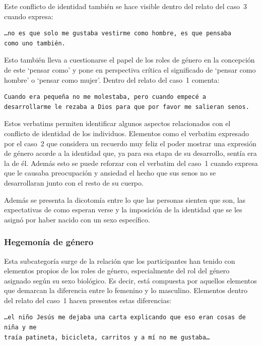 Este conflicto de identidad también se hace visible dentro del relato del caso~3
cuando expresa:

\begin{verbatim}
…no es que solo me gustaba vestirme como hombre, es que pensaba
como uno también.
\end{verbatim}

Esto también lleva a cuestionarse el papel de los roles de género en la
concepción de este ‘pensar como’ y pone en perspectiva crítica el significado de
‘pensar como hombre’ o ‘pensar como mujer’. Dentro del relato del caso~1
comenta:

\begin{verbatim}
Cuando era pequeña no me molestaba, pero cuando empecé a
desarrollarme le rezaba a Dios para que por favor me salieran senos.
\end{verbatim}

Estos verbatims permiten identificar algunos aspectos relacionados con el
conflicto de identidad de los individuos. Elementos como el verbatim expresado
por el caso~2 que considera un recuerdo muy feliz el poder mostrar una
expresión de género acorde a la identidad que, ya para esa etapa de su
desarrollo, sentía era la de él. Además esto se puede reforzar con el verbatim
del caso~1 cuando expresa que le causaba preocupación y ansiedad el hecho que
sus senos no se desarrollaran junto con el resto de su cuerpo.

Además se presenta la dicotomía entre lo que las personas sienten que son, las
expectativas de como esperan verse y la imposición de la identidad que se
les asignó por haber nacido con un sexo específico.

\subsubsection{Hegemonía de género}

Esta subcategoría surge de la relación que los participantes han tenido con
elementos propios de los roles de género, especialmente del rol del género
asignado según su sexo biológico. Es decir, está compuesta por aquellos
elementos que demarcan la diferencia entre lo femenino y lo masculino. Elementos
dentro del relato del caso~1 hacen presentes estas diferencias:

\begin{verbatim}
…el niño Jesús me dejaba una carta explicando que eso eran cosas de niña y me
traía patineta, bicicleta, carritos y a mí no me gustaba…
\end{verbatim}

